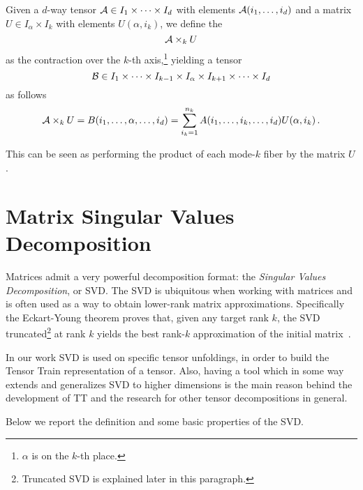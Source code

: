 \begin{Def} \label{def:tensor-matrix-product}
  Given a $d$-way tensor $\mathcal{A} \in I_1 \times \cdots \times I_d$ with elements $\mathcal{A}(i_1,\ldots,i_d)$ and a matrix $U \in I_\alpha \times I_k$ with elements $U(\alpha,i_k)$, we define the 
  \begin{equation*}
    \mathcal{A} \times_k U
  \end{equation*}
  as the contraction over the $k$-th axis,\footnote{$\alpha$ is on the $k$-th place.} yielding a tensor
  \begin{equation*}
    \mathcal{B} \in I_1 \times \cdots \times I_{k-1} \times I_\alpha \times I_{k+1} \times \cdots \times I_d
  \end{equation*}
  as follows
  \begin{equation*}
    \mathcal{A} \times_k U = B(i_1,\ldots,\alpha,\ldots,i_d) = \sum_{i_k = 1}^{n_k} A(i_1,\ldots,i_k,\ldots,i_d) U(\alpha,i_k)\, .
  \end{equation*}
\end{Def}
This can be seen as performing the product of each mode-$k$ fiber by the matrix $U$.

\section{Matrix Singular Values Decomposition}
Matrices admit a very powerful decomposition format: the \emph{Singular Values Decomposition}, or SVD. The SVD is ubiquitous when working with matrices and is often used as a way to obtain lower-rank matrix approximations. Specifically the Eckart-Young theorem proves that, given any target rank $k$, the SVD truncated\footnote{Truncated SVD is explained later in this paragraph.} at rank $k$ yields the best rank-$k$ approximation of the initial matrix~\cite{SVDbestapprox}.

In our work SVD is used on specific tensor unfoldings, in order to build the Tensor Train representation of a tensor. Also, having a tool which in some way extends and generalizes SVD to higher dimensions is the main reason behind the development of TT and the research for other tensor decompositions in general.

Below we report the definition and some basic properties of the SVD.

